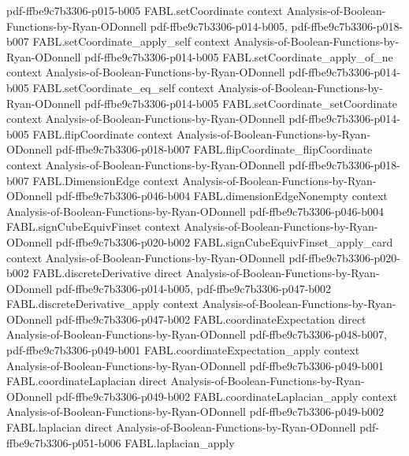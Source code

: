 \begin{theorem}
  {pdf-ffbe9c7b3306-p015-b005}
\proofstep
  {FABL.setCoordinate}
  {context}
  {Analysis-of-Boolean-Functions-by-Ryan-ODonnell}
  {pdf-ffbe9c7b3306-p014-b005,
    pdf-ffbe9c7b3306-p018-b007}
\proofstep
  {FABL.setCoordinate_apply_self}
  {context}
  {Analysis-of-Boolean-Functions-by-Ryan-ODonnell}
  {pdf-ffbe9c7b3306-p014-b005}
\proofstep
  {FABL.setCoordinate_apply_of_ne}
  {context}
  {Analysis-of-Boolean-Functions-by-Ryan-ODonnell}
  {pdf-ffbe9c7b3306-p014-b005}
\proofstep
  {FABL.setCoordinate_eq_self}
  {context}
  {Analysis-of-Boolean-Functions-by-Ryan-ODonnell}
  {pdf-ffbe9c7b3306-p014-b005}
\proofstep
  {FABL.setCoordinate_setCoordinate}
  {context}
  {Analysis-of-Boolean-Functions-by-Ryan-ODonnell}
  {pdf-ffbe9c7b3306-p014-b005}
\proofstep
  {FABL.flipCoordinate}
  {context}
  {Analysis-of-Boolean-Functions-by-Ryan-ODonnell}
  {pdf-ffbe9c7b3306-p018-b007}
\proofstep
  {FABL.flipCoordinate_flipCoordinate}
  {context}
  {Analysis-of-Boolean-Functions-by-Ryan-ODonnell}
  {pdf-ffbe9c7b3306-p018-b007}
\proofstep
  {FABL.DimensionEdge}
  {context}
  {Analysis-of-Boolean-Functions-by-Ryan-ODonnell}
  {pdf-ffbe9c7b3306-p046-b004}
\proofstep
  {FABL.dimensionEdgeNonempty}
  {context}
  {Analysis-of-Boolean-Functions-by-Ryan-ODonnell}
  {pdf-ffbe9c7b3306-p046-b004}
\proofstep
  {FABL.signCubeEquivFinset}
  {context}
  {Analysis-of-Boolean-Functions-by-Ryan-ODonnell}
  {pdf-ffbe9c7b3306-p020-b002}
\proofstep
  {FABL.signCubeEquivFinset_apply_card}
  {context}
  {Analysis-of-Boolean-Functions-by-Ryan-ODonnell}
  {pdf-ffbe9c7b3306-p020-b002}
\proofstep
  {FABL.discreteDerivative}
  {direct}
  {Analysis-of-Boolean-Functions-by-Ryan-ODonnell}
  {pdf-ffbe9c7b3306-p014-b005,
    pdf-ffbe9c7b3306-p047-b002}
\proofstep
  {FABL.discreteDerivative_apply}
  {context}
  {Analysis-of-Boolean-Functions-by-Ryan-ODonnell}
  {pdf-ffbe9c7b3306-p047-b002}
\proofstep
  {FABL.coordinateExpectation}
  {direct}
  {Analysis-of-Boolean-Functions-by-Ryan-ODonnell}
  {pdf-ffbe9c7b3306-p048-b007,
    pdf-ffbe9c7b3306-p049-b001}
\proofstep
  {FABL.coordinateExpectation_apply}
  {context}
  {Analysis-of-Boolean-Functions-by-Ryan-ODonnell}
  {pdf-ffbe9c7b3306-p049-b001}
\proofstep
  {FABL.coordinateLaplacian}
  {direct}
  {Analysis-of-Boolean-Functions-by-Ryan-ODonnell}
  {pdf-ffbe9c7b3306-p049-b002}
\proofstep
  {FABL.coordinateLaplacian_apply}
  {context}
  {Analysis-of-Boolean-Functions-by-Ryan-ODonnell}
  {pdf-ffbe9c7b3306-p049-b002}
\proofstep
  {FABL.laplacian}
  {direct}
  {Analysis-of-Boolean-Functions-by-Ryan-ODonnell}
  {pdf-ffbe9c7b3306-p051-b006}
\proofstep
  {FABL.laplacian_apply}

\end{theorem}
